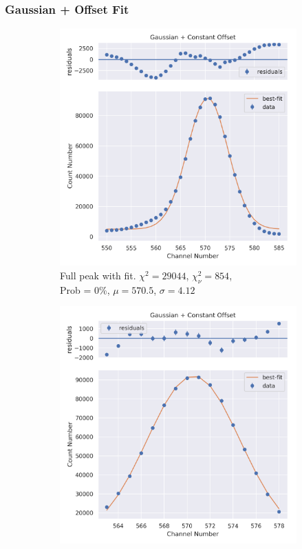 \documentclass[11pt,a4paper]{article}
\begin{document}
\subsubsection{Gaussian + Offset Fit}
\begin{figure}[H]
  \centering
  \begin{subfigure}{.5\linewidth}
    \centering
    \includegraphics[width=\linewidth]{./Images/Barium133/Gauss/Gauss_1_Full.png}
    \caption{Full peak with fit. $\chi^2 = 29044$, $\chi^2_\nu = 854$, \\ Prob = 0\%, $\mu = 570.5$, $\sigma = 4.12$ }
  \end{subfigure}%
  \begin{subfigure}{.5\linewidth}
    \centering
    \includegraphics[width=\linewidth]{./Images/Barium133/Gauss/Gauss_1_Zoom.png}

\end{subfigure}
\end{figure}
\end{document}
